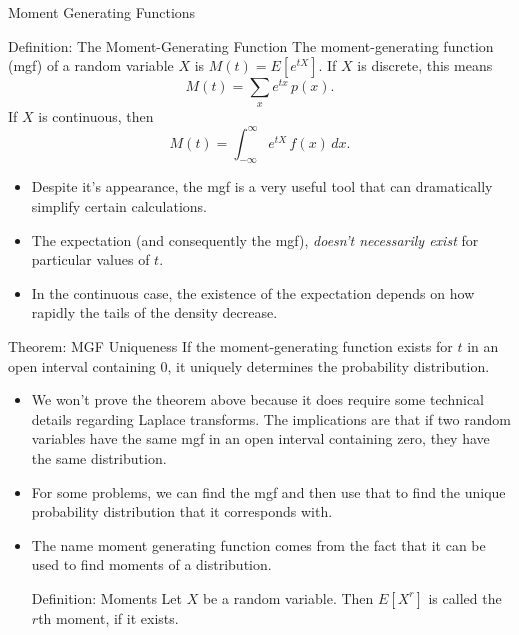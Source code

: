 \begin{frame}[allowframebreaks]{Moment Generating Functions}

  \begin{block}{Definition: The Moment-Generating Function}
    The \alert{moment-generating function} (mgf) of a random variable $X$ is $M(t) = E[e^{tX}]$.
    If $X$ is discrete, this means
    $$
    M(t) = \sum_x e^{tx}\, p(x).
    $$
    If $X$ is continuous, then
    $$
    M(t) = \int_{-\infty}^\infty e^{tX}\, f(x)\, dx.
    $$
  \end{block}
  
  \begin{itemize}
    \item Despite it's appearance, the mgf is a very useful tool that can dramatically simplify certain calculations.
    \item The expectation (and consequently the mgf), \emph{doesn't necessarily exist} for particular values of $t$.
    \item In the continuous case, the existence of the expectation depends on how rapidly the tails of the density decrease.
  \end{itemize}
  
  \begin{block}{Theorem: MGF Uniqueness}
    If the moment-generating function exists for $t$ in an open interval containing $0$, it uniquely determines the probability distribution. 
  \end{block}
  
  \begin{itemize}
    \item We won't prove the theorem above because it does require some technical details regarding Laplace transforms. The implications are that if two random variables have the same mgf in an open interval containing zero, they have the same distribution.
    \item For some problems, we can find the mgf and then use that to find the unique probability distribution that it corresponds with.
    \item The name \alert{moment generating function} comes from the fact that it can be used to find moments of a distribution.
    
    \begin{block}{Definition: Moments}
      Let $X$ be a random variable. Then $E[X^r]$ is called the $r$th \alert{moment}, if it exists. 
    \end{block}
    

\end{itemize}
\end{frame}
